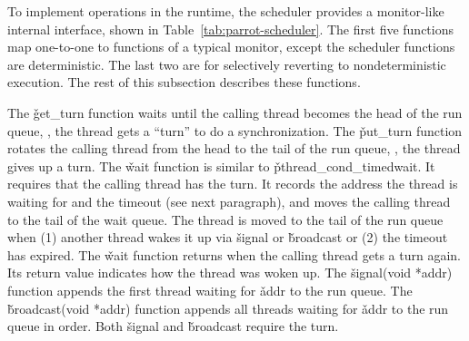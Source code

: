 \begin{table}[t]
\centering
\small
\begin{minipage}[t]{.25\textwidth}
\end{minipage}
\vspace{-.05in}
\caption{{\em Scheduler primitives.}} \label{tab:parrot-scheduler}
\vspace{-.05in}
\end{table}

To implement operations in the \parrot runtime, the scheduler provides a
monitor-like internal interface, shown in Table~\ref{tab:parrot-scheduler}.  The
first five functions map one-to-one to functions of a typical monitor,
except the scheduler functions are deterministic.  The last two are for
selectively reverting to nondeterministic execution.  The rest of this
subsection describes these functions.

The
\v{get\_turn} function waits until the calling thread becomes the head
of the run queue, \ie, the thread gets a ``turn'' to do a
synchronization.  The \v{put\_turn} function rotates the calling thread
from the head to the tail of the run queue, \ie, the thread gives up a
turn. The \v{wait} function is similar to
\v{pthread\_cond\_timedwait}.  It requires that the calling thread has the
turn.  It records the address the thread is waiting for and the timeout
(see next paragraph), and moves the calling thread to the tail
of the wait queue.  The thread is moved to the tail of the
run queue when (1) another thread wakes it up via \v{signal}
or \v{broadcast} or (2) the timeout has expired. The \v{wait}
function returns when the calling thread gets a turn again.  Its return
value indicates how the thread was woken up. The \v{signal(void *addr)}
function appends the first thread waiting for \v{addr} to the run queue.  The
\v{broadcast(void *addr)} function appends all threads waiting for
\v{addr} to the run queue in order.  Both \v{signal} and \v{broadcast} require
the turn.

